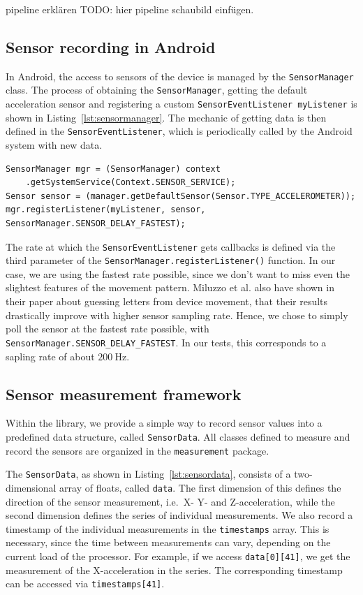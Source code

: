 pipeline erklären
TODO: hier pipeline schaubild einfügen.


\subsection{Sensor recording in Android}\label{subsection:sensorrecording}
In Android, the access to sensors of the device is managed by the \lstinline$SensorManager$ class. The process of obtaining the \lstinline$SensorManager$, getting the default acceleration sensor and registering a custom \lstinline$SensorEventListener myListener$ is shown in Listing~\ref{lst:sensormanager}. The mechanic of getting data is then defined in the \lstinline$SensorEventListener$, which is periodically called by the Android system with new data.

\begin{lstlisting}[float,
caption={Obtaining the default acceleration sensor data in Android},
label={lst:sensormanager}]
SensorManager mgr = (SensorManager) context
    .getSystemService(Context.SENSOR_SERVICE);
Sensor sensor = (manager.getDefaultSensor(Sensor.TYPE_ACCELEROMETER));
mgr.registerListener(myListener, sensor, SensorManager.SENSOR_DELAY_FASTEST);
\end{lstlisting}

The rate at which the \lstinline$SensorEventListener$ gets callbacks is defined via the third parameter of the \lstinline$SensorManager.registerListener()$ function. In our case, we are using the fastest rate possible, since we don't want to miss even the slightest features of the movement pattern. Miluzzo et al.\cite{miluzzo2012tapprints} also have shown in their paper about guessing letters from device movement, that their results drastically improve with higher sensor sampling rate. Hence, we chose to simply poll the sensor at the fastest rate possible, with \lstinline$SensorManager.SENSOR_DELAY_FASTEST$. In our tests, this corresponds to a sapling rate of about $\SI{200}{\hertz}$.

\subsection{Sensor measurement framework}
Within the library, we provide a simple way to record sensor values into a predefined data structure, called \lstinline$SensorData$. All classes defined to measure and record the sensors are organized in the \lstinline$measurement$ package.

The \lstinline$SensorData$, as shown in Listing~\ref{lst:sensordata}, consists of a two-dimensional array of floats, called \lstinline$data$. The first dimension of this defines the direction of the sensor measurement, i.e.\ X- Y- and Z-acceleration, while the second dimension defines the series of individual measurements. We also record a timestamp of the individual measurements in the \lstinline$timestamps$ array. This is necessary, since the time between measurements can vary, depending on the current load of the processor.
For example, if we access \lstinline$data[0][41]$, we get the  measurement of the X-acceleration in the series. The corresponding timestamp can be accessed via \lstinline$timestamps[41]$.

